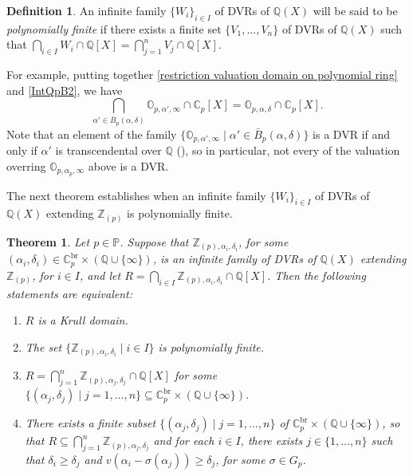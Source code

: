 \documentclass[10pt]{article}
\numberwithin{equation}{section}
\newtheorem{Thm}[equation]{Theorem}
\theoremstyle{definition}
\newtheorem{Def}[equation]{Definition}
\theoremstyle{definition}
\newcommand{\Q}{\mathbb{Q}}
\newcommand{\Z}{\mathbb{Z}}
\newcommand{\C}{\mathbb{C}}
\renewcommand{\O}{\mathbb{O}}
\newcommand{\PP}{\mathbb{P}}
\newcommand{\br}{\text{br}}
\begin{document}
\begin{Def}
An infinite family $\{W_i\}_{i\in I}$ of DVRs of $\Q(X)$ will be said to be
\emph{polynomially finite} if there exists a finite set $\{V_1, \dots , V_n\}$ of DVRs of $\Q(X)$ such that
$\bigcap\limits_{i\in I}W_i\cap \Q[X]=\bigcap\limits_{j=1}^n V_j \cap\Q[X]$.
\end{Def}

For example, putting together \eqref{restriction valuation domain on polynomial ring} and \eqref{IntQpB2}, we have
$$\bigcap_{\alpha'\in\bar B_p(\alpha,\delta)}\O_{p,\alpha',\infty}\cap\C_p[X]=\O_{p,\alpha,\delta}\cap\C_p[X].$$
Note that an element of the family $\{\O_{p,\alpha',\infty}\mid\alpha'\in \bar B_p(\alpha,\delta)\}$ is a DVR
if and only if $\alpha'$ is transcendental over $\Q$ (\cite[Proposition 2.2]{PerTransc}), so in particular, not every of the valuation overring $\O_{p,\alpha_p,\infty}$ above is a DVR.

The next theorem establishes when an infinite family $\{W_i\}_{i\in I}$ of DVRs of $\Q(X)$ extending $\Z_{(p)}$ is polynomially finite.



\begin{Thm}\label{polynomially finite}
Let $p\in\PP$. Suppose that $\Z_{(p),\alpha_i,\delta_i}$, for some $(\alpha_i,\delta_i)\in\C_p^{\br}\times(\Q\cup\{\infty\})$, 
is an infinite family of DVRs of $\Q(X)$ extending $\Z_{(p)}$, for $i\in I$, 
and let $R = \bigcap\limits_{i\in I}\Z_{(p),\alpha_i,\delta_i}\cap \Q[X]$.
Then the following statements are equivalent:
\begin{enumerate}
\item[{\em (1)}] $R$ is a Krull domain.
\item[{\em (2)}] The set $\{\Z_{(p),\alpha_i,\delta_i} \mid i \in I\}$ is polynomially finite.
\item[{\em (3)}] $R = \bigcap\limits_{j=1}^n \Z_{(p),\alpha_j,\delta_j}\cap\Q[X]$ for some $\{(\alpha_j,\delta_j) \mid j =1, \dots ,n\} \subseteq \C_p^{\br}\times(\Q\cup\{\infty\})$.
\item[{\em (4)}] There exists a finite subset $\{(\alpha_j,\delta_j) \mid j =1, \dots ,n\}$ of $\C_p^{\br}\times(\Q\cup\{\infty\})$, 
so that $R \subseteq \bigcap\limits_{j=1}^n\Z_{(p), \alpha_j, \delta_j}$
and for each $i\in I$, there exists $j\in\{1,\ldots,n\}$ such that $\delta_i\geq\delta_j$ and $v(\alpha_i-\sigma(\alpha_j))\geq \delta_j$,
for some $\sigma\in G_p$.
\end{enumerate}
\end{Thm}
\end{document}
